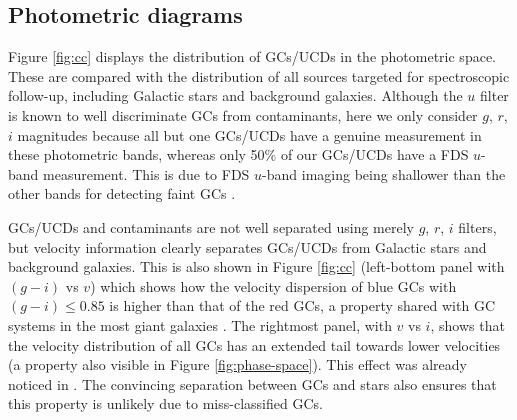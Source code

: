 \documentclass[usenatbib]{mnras}
\begin{document}
\subsection{Photometric diagrams}


Figure \ref{fig:cc} displays the distribution of GCs/UCDs in the photometric
space. These are compared with the distribution of all sources targeted for
spectroscopic follow-up, including Galactic stars and background galaxies.
Although the $u$ filter is known to well discriminate GCs from contaminants,
here we only consider $g$, $r$, $i$ magnitudes because all but one GCs/UCDs
have a genuine measurement in these photometric bands, whereas only 50\% of our
GCs/UCDs have a FDS $u$-band measurement. This is due to FDS $u$-band imaging being
shallower than the other bands for detecting faint GCs \citep{DAbrusco16}.

GCs/UCDs and contaminants are not well separated using merely $g$, $r$, $i$
filters, but velocity information clearly separates GCs/UCDs from Galactic
stars and background galaxies. This is also shown in Figure \ref{fig:cc}
(left-bottom panel with $(g-i)$ vs $v$) which shows how the velocity
dispersion of blue GCs with $(g-i) \le 0.85$ is higher than that of the red GCs, a
property shared with GC systems in the most giant galaxies \citep[e.g.,][]{Pota13}.
The rightmost panel, with $v$ vs $i$, shows that
the velocity distribution of all GCs has an extended tail towards lower velocities (a
property also visible in Figure \ref{fig:phase-space}). This effect was already
noticed in \citet{Schuberth}. The convincing separation between GCs and stars
also ensures that this property is unlikely due to miss-classified GCs.
\end{document}
